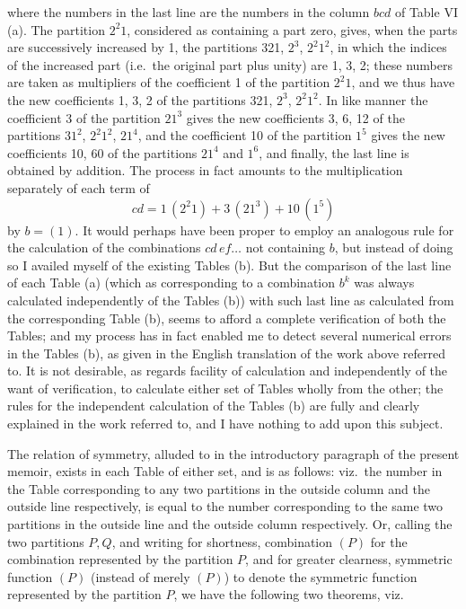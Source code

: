 \documentclass[11pt]{article}
\begin{document}
where the numbers in the last line are the numbers in the column $bcd$ of Table VI (a). The partition $2^2 1$, considered as containing a part zero, gives, when the parts are successively increased by 1, the partitions 321, $2^3$, $2^2 1^2$, in which the indices of the increased part (i.e.\ the original part plus unity) are 1, 3, 2; these numbers are taken as multipliers of the coefficient 1 of the partition $2^2 1$, and we thus have the new coefficients 1, 3, 2 of the partitions 321, $2^3$, $2^2 1^2$. In like manner the coefficient 3 of the partition $21^3$ gives the new coefficients 3, 6, 12 of the partitions $31^2$, $2^2 1^2$, $21^4$, and the coefficient 10 of the partition $1^5$ gives the new coefficients 10, 60 of the partitions $21^4$ and $1^6$, and finally, the last line is obtained by addition. The process in fact amounts to the multiplication separately of each term of
\[
cd = 1\,(2^2 1) + 3\,(21^3) + 10\,(1^5)
\]
by $b = (1)$. It would perhaps have been proper to employ an analogous rule for the calculation of the combinations $cd\, ef\ldots$ not containing $b$, but instead of doing so I availed myself of the existing Tables (b). But the comparison of the last line of each Table (a) (which as corresponding to a combination $b^k$ was always calculated independently of the Tables (b)) with such last line as calculated from the corresponding Table (b), seems to afford a complete verification of both the Tables; and my process has in fact enabled me to detect several numerical errors in the Tables (b), as given in the English translation of the work above referred to. It is not desirable, as regards facility of calculation and independently of the want of verification, to calculate either set of Tables wholly from the other; the rules for the independent calculation of the Tables (b) are fully and clearly explained in the work referred to, and I have nothing to add upon this subject.

\medskip

The relation of symmetry, alluded to in the introductory paragraph of the present memoir, exists in each Table of either set, and is as follows: viz.\ the number in the Table corresponding to any two partitions in the outside column and the outside line respectively, is equal to the number corresponding to the same two partitions in the outside line and the outside column respectively. Or, calling the two partitions $P, Q$, and writing for shortness, combination $(P)$ for the combination represented by the partition $P$, and for greater clearness, symmetric function $(P)$ (instead of merely $(P)$) to denote the symmetric function represented by the partition $P$, we have the following two theorems, viz.
\end{document}
